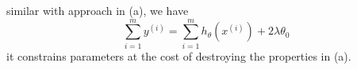 \begin{answer}
similar with approach in (a), we have
\[ \sum_{i=1}^{m}y^{(i)}=\sum_{i=1}^{m}h_{\theta}(x^{(i)})+2\lambda\theta_0 \]
it constrains parameters at the cost of destroying the properties in (a).
\end{answer}
